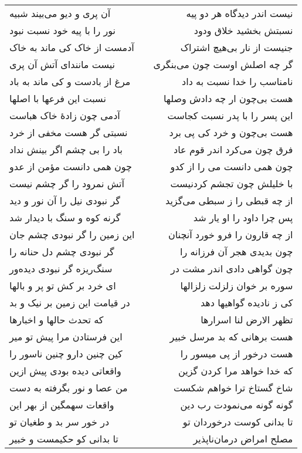 \begin{center}
\begin{longtable}{l p{0.5cm} r}
\\
آن پری و دیو می‌بیند شبیه
&&
نیست اندر دیدگاه هر دو پیه
\\
نور را با پیه خود نسبت نبود
&&
نسبتش بخشید خلاق ودود
\\
آدمست از خاک کی ماند به خاک
&&
جنیست از نار بی‌هیچ اشتراک
\\
نیست مانندای آتش آن پری
&&
گر چه اصلش اوست چون می‌بنگری
\\
مرغ از بادست و کی ماند به باد
&&
نامناسب را خدا نسبت به داد
\\
نسبت این فرعها با اصلها
&&
هست بی‌چون ار چه دادش وصلها
\\
آدمی چون زادهٔ خاک هباست
&&
این پسر را با پدر نسبت کجاست
\\
نسبتی گر هست مخفی از خرد
&&
هست بی‌چون و خرد کی پی برد
\\
باد را بی چشم اگر بینش نداد
&&
فرق چون می‌کرد اندر قوم عاد
\\
چون همی دانست مؤمن از عدو
&&
چون همی دانست می را از کدو
\\
آتش نمرود را گر چشم نیست
&&
با خلیلش چون تجشم کردنیست
\\
گر نبودی نیل را آن نور و دید
&&
از چه قبطی را ز سبطی می‌گزید
\\
گرنه کوه و سنگ با دیدار شد
&&
پس چرا داود را او یار شد
\\
این زمین را گر نبودی چشم جان
&&
از چه قارون را فرو خورد آنچنان
\\
گر نبودی چشم دل حنانه را
&&
چون بدیدی هجر آن فرزانه را
\\
سنگ‌ریزه گر نبودی دیده‌ور
&&
چون گواهی دادی اندر مشت در
\\
ای خرد بر کش تو پر و بالها
&&
سوره بر خوان زلزلت زلزالها
\\
در قیامت این زمین بر نیک و بد
&&
کی ز نادیده گواهیها دهد
\\
که تحدث حالها و اخبارها
&&
تظهر الارض لنا اسرارها
\\
این فرستادن مرا پیش تو میر
&&
هست برهانی که بد مرسل خبیر
\\
کین چنین دارو چنین ناسور را
&&
هست درخور از پی میسور را
\\
واقعاتی دیده بودی پیش ازین
&&
که خدا خواهد مرا کردن گزین
\\
من عصا و نور بگرفته به دست
&&
شاخ گستاخ ترا خواهم شکست
\\
واقعات سهمگین از بهر این
&&
گونه گونه می‌نمودت رب دین
\\
در خور سر بد و طغیان تو
&&
تا بدانی کوست درخوردان تو
\\
تا بدانی کو حکیمست و خبیر
&&
مصلح امراض درمان‌ناپذیر
\\

\end{longtable}
\end{center}
